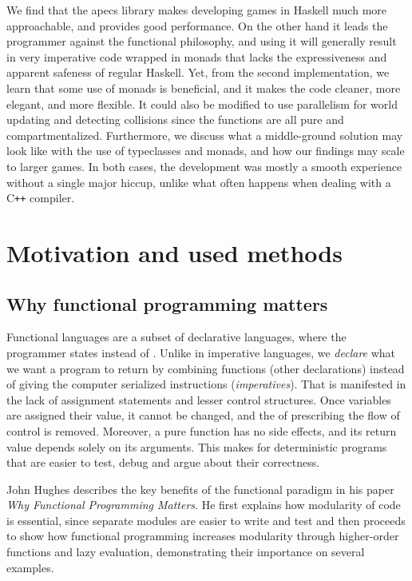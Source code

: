 \documentclass[
  digital, %
  color,   %
  table,   %
  oneside, %
  lof,     %
  lot,     %
]{fithesis3}
\newcommand{\cpp}{C\nolinebreak\texttt{+}\nolinebreak\texttt{+}}
\begin{document}
We find that the apecs library makes developing games
in Haskell much more approachable, and provides good performance.
On the other hand it leads the programmer against the functional philosophy, and using it
will generally result in very imperative code wrapped in monads
that lacks the expressiveness and apparent safeness of regular Haskell.
Yet, from the second implementation, we learn that
some use of monads is beneficial, and it makes the code cleaner, more elegant,
and more flexible. It could also be modified to use parallelism for
world updating and detecting collisions since the functions are all pure and compartmentalized.
Furthermore, we discuss what a middle-ground solution may look like
with the use of typeclasses and monads, and how our findings may scale to larger games.
In both cases, the development was
mostly a smooth experience without a single major hiccup,
unlike what often happens when dealing with a \cpp{} compiler.




\chapter{Motivation and used methods}
\label{chap:motivationandmethods}


\section{Why functional programming matters}
\label{sect:whyfpmatters}

Functional languages are a subset of declarative languages, where the
programmer states  instead of . Unlike in imperative languages,
we \emph{declare} what we want a program to return by combining functions (other declarations)
instead of giving the computer serialized instructions (\emph{imperatives}).
That is manifested in the lack of assignment statements and lesser control structures.
Once variables are assigned their value, it cannot be changed,
and the  of prescribing the flow of control
is removed.\cite{whyfpmatters} Moreover, a pure function has no side effects,
and its return value depends solely on its arguments. This makes for deterministic
programs that are easier to test, debug and argue about their correctness.

John Hughes describes the key benefits of the functional paradigm in his paper
\textit{Why Functional Programming Matters}.\cite{whyfpmatters} He first
explains how modularity of code is essential, since
separate modules are easier to write and test and then proceeds
to show how functional programming increases modularity
through higher-order functions and lazy evaluation, demonstrating
their importance on several examples.
\end{document}
